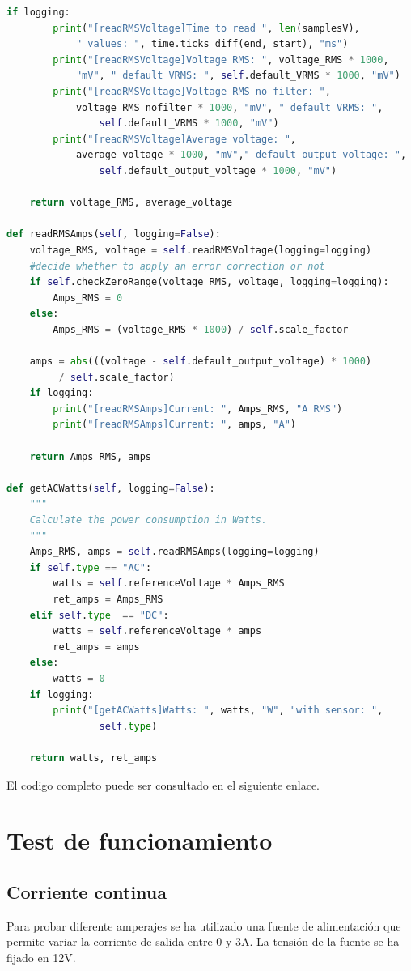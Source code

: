 \begin{titlepage}
\begin{lstlisting}[language=python]
	if logging:
		print("[readRMSVoltage]Time to read ", len(samplesV), 
			" values: ", time.ticks_diff(end, start), "ms")
		print("[readRMSVoltage]Voltage RMS: ", voltage_RMS * 1000, 
			"mV", " default VRMS: ", self.default_VRMS * 1000, "mV")
		print("[readRMSVoltage]Voltage RMS no filter: ", 
			voltage_RMS_nofilter * 1000, "mV", " default VRMS: ", 
				self.default_VRMS * 1000, "mV")
		print("[readRMSVoltage]Average voltage: ", 
			average_voltage * 1000, "mV"," default output voltage: ", 
				self.default_output_voltage * 1000, "mV")
	
	return voltage_RMS, average_voltage

def readRMSAmps(self, logging=False):
	voltage_RMS, voltage = self.readRMSVoltage(logging=logging)
	#decide whether to apply an error correction or not
	if self.checkZeroRange(voltage_RMS, voltage, logging=logging):
		Amps_RMS = 0
	else:
		Amps_RMS = (voltage_RMS * 1000) / self.scale_factor

	amps = abs(((voltage - self.default_output_voltage) * 1000)
		 / self.scale_factor)
	if logging:
		print("[readRMSAmps]Current: ", Amps_RMS, "A RMS")
		print("[readRMSAmps]Current: ", amps, "A")

	return Amps_RMS, amps

def getACWatts(self, logging=False):
	"""
	Calculate the power consumption in Watts.
	"""
	Amps_RMS, amps = self.readRMSAmps(logging=logging)
	if self.type == "AC":
		watts = self.referenceVoltage * Amps_RMS
		ret_amps = Amps_RMS
	elif self.type  == "DC":
		watts = self.referenceVoltage * amps
		ret_amps = amps
	else:
		watts = 0
	if logging:
		print("[getACWatts]Watts: ", watts, "W", "with sensor: ", 
				self.type)

	return watts, ret_amps

\end{lstlisting}

El codigo completo puede ser consultado en el siguiente enlace\cite{ref23}.\\

\section{Test de funcionamiento}
\subsection{Corriente continua}
Para probar diferente amperajes se ha utilizado una fuente de alimentación que permite variar la corriente de salida entre 0 y 3A. La tensión de la fuente se ha fijado en 12V.\\

\end{titlepage}
